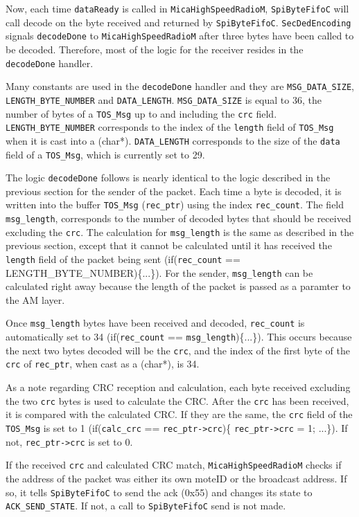 \documentclass[11pt]{article}
\begin{document}
Now, each time {\tt dataReady} is called in {\tt MicaHighSpeedRadioM},
{\tt SpiByteFifoC} will call decode on the byte received and returned by
{\tt SpiByteFifoC}. {\tt SecDedEncoding} signals {\tt decodeDone} to {\tt MicaHighSpeedRadioM}
after three bytes have been called to be decoded. Therefore, most of
the logic for the receiver resides in the {\tt decodeDone} handler.

Many constants are used in the {\tt decodeDone} handler and they are
{\tt MSG\_DATA\_SIZE}, {\tt LENGTH\_BYTE\_NUMBER} and {\tt DATA\_LENGTH}. {\tt MSG\_DATA\_SIZE} is equal to 36,
the number of bytes of a {\tt TOS\_Msg} up to and including the {\tt crc} field.
{\tt LENGTH\_BYTE\_NUMBER} corresponds to the index of the {\tt length} field of
{\tt TOS\_Msg} when it is cast into a (char*).  {\tt DATA\_LENGTH} corresponds to
the size of the {\tt data} field of a {\tt TOS\_Msg}, which is currently set to
29.

The logic {\tt decodeDone} follows is nearly identical to the logic described
in the previous section for the sender of the packet. Each time a byte
is decoded, it is written into the buffer {\tt TOS\_Msg} ({\tt rec\_ptr}) using the
index {\tt rec\_count}. The field {\tt msg\_length}, corresponds to the number
of decoded bytes that should be received excluding the {\tt crc}. The
calculation for {\tt msg\_length} is the same as described in the previous
section, except that it cannot be calculated until it has received the
{\tt length} field of the packet being sent (if({\tt rec\_count} ==
LENGTH\_BYTE\_NUMBER)\{...\}). For the sender, {\tt msg\_length} can be calculated right away because the
length of the packet is passed as a paramter to the AM layer. 

Once {\tt msg\_length} bytes have been received and decoded, {\tt rec\_count} is
automatically set to 34 (if({\tt rec\_count} == {\tt msg\_length})\{...\}). This occurs because the next two bytes
decoded will be the {\tt crc}, and the index of the first byte of the {\tt crc} of {\tt rec\_ptr}, when
cast as a (char*), is 34.

As a note regarding CRC reception and calculation, each byte received
excluding the two {\tt crc} bytes is used to calculate the CRC. After the
{\tt crc} has been received, it is compared with the calculated CRC. If they
are the same, the {\tt crc} field of the {\tt TOS\_Msg} is set to 1 (if({\tt calc\_crc} ==
{\tt rec\_ptr->crc})\{ {\tt rec\_ptr->crc} = 1; ...\}). If not, {\tt rec\_ptr->crc} is set to
0.

If the received {\tt crc} and calculated CRC match, {\tt MicaHighSpeedRadioM}
checks if the address of the packet was either its own moteID or the
broadcast address. If so, it tells {\tt SpiByteFifoC} to send the ack
(0x55) and changes its state to {\tt ACK\_SEND\_STATE}. If not, a call to
{\tt SpiByteFifoC} send is not made.
\end{document}
